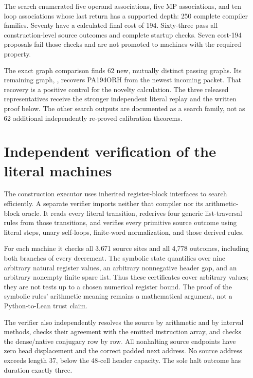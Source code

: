 \documentclass[11pt]{article}
\newcommand{\file}[1]{\path{#1}}
\begin{document}
The search enumerated five operand associations, five MP associations,
and ten loop associations whose last return has a supported depth:
250 complete compiler families. Seventy have a calculated final cost
of 194. Sixty-three pass all construction-level source outcomes and
complete startup checks. Seven cost-194 proposals fail those checks
and are not promoted to machines with the required property.

The exact graph comparison finds 62 new, mutually distinct passing
graphs. Its remaining graph, \file{A0M2L11_194}, recovers PA194ORH
from the newest incoming packet. That recovery is a positive control
for the novelty calculation. The three released representatives receive
the stronger independent literal replay and the written proof below.
The other search outputs are documented as a search family, not as
62 additional independently re-proved calibration theorems.

\section{Independent verification of the literal machines}
\label{sec:physical}

The construction executor uses inherited register-block interfaces
to search efficiently. A separate verifier imports neither that compiler
nor its arithmetic-block oracle. It reads every literal transition,
rederives four generic list-traversal rules from those transitions,
and verifies every primitive source outcome using literal steps,
unary self-loops, finite-word normalization, and those derived rules.

For each machine it checks all 3,671 source sites and all 4,778
outcomes, including both branches of every decrement. The symbolic
state quantifies over nine arbitrary natural register values, an
arbitrary nonnegative header gap, and an arbitrary nonempty finite
spare list. Thus these certificates cover arbitrary values; they are
not tests up to a chosen numerical register bound. The proof of the
symbolic rules' arithmetic meaning remains a mathematical argument,
not a Python-to-Lean trust claim.

The verifier also independently resolves the source by arithmetic and
by interval methods, checks their agreement with the emitted instruction
array, and checks the dense/native conjugacy row by row. All nonhalting
source endpoints have zero head displacement and the correct padded
next address. No source address exceeds length 37, below the 48-cell
header capacity. The sole halt outcome has duration exactly three.
\end{document}
